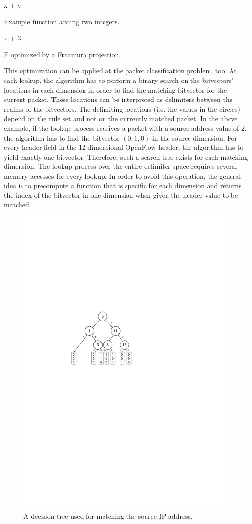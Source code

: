 \documentclass[conference]{IEEEtran}
\begin{document}
\begin{algorithm}
\begin{algorithmic}[1]
    \State \Return x + y
\EndFunction
\end{algorithmic}
\caption{Example function adding two integers.}
\label{alg:futamura-f}
\end{algorithm}

\vspace{-0.5cm}

\begin{algorithm}
\begin{algorithmic}[1]
    \State \Return x + 3
\EndFunction
\end{algorithmic}
\caption{F optimized by a Futamura projection.}
\label{alg:futamura-f-optimized}
\end{algorithm}

This optimization can be applied at the packet classification problem, too.
At each lookup, the algorithm has to perform a binary search on the bitvectors' 
locations in each dimension in order to find the matching bitvector for the current packet.
These locations can be interpreted as delimiters between the realms of the bitvectors.
The delimiting locations (i.e. the values in the circles) depend on the 
rule set and not on the currently matched packet.
In the above example, if the lookup process receives a packet with a source
address value of 2, the algorithm has to find the bitvector $(0, 1, 0)$ in the source dimension.
For every header field in the 12-dimensional OpenFlow header, the algorithm has to yield exactly one bitvector.
Therefore, such a search tree exists for each matching dimension.
The lookup process over the entire delimiter space requires several memory accesses for every lookup.
In order to avoid this operation, the general idea is to precompute a function that 
is specific for each dimension and returns the index of the bitvector in one 
dimension when given the header value to be matched.

\begin{figure}
\centering
\includegraphics[width=0.42\linewidth]{images/bv-tree-simple}
\caption{A decision tree used for matching the source IP address.}
\label{fig:bv-tree}
\end{figure}
\end{document}
